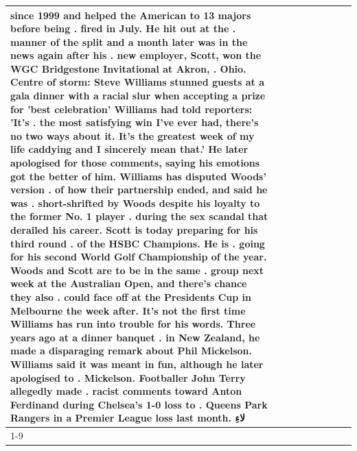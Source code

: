 \begin{table}[H]
\begin{tabular}{lllrlllll}
since 1999 and helped the American to 13 majors before being . fired in July. He hit out at the . manner of the split and a month later was in the news again after his . new employer, Scott, won the WGC Bridgestone Invitational at Akron, . Ohio. Centre of storm: Steve Williams stunned guests at a gala dinner with a racial slur when accepting a prize for 'best celebration' Williams had told reporters: 'It's . the most satisfying win I've ever had, there's no two ways about it. It's the greatest week of my life caddying and I sincerely mean that.' He later apologised for those comments, saying his emotions got the better of him. Williams has disputed Woods' version . of how their partnership ended, and said he was . short-shrifted by Woods despite his loyalty to the former No. 1 player . during the sex scandal that derailed his career. Scott is today preparing for his third round . of the HSBC Champions. He is . going for his second World Golf Championship of the year. Woods and Scott are to be in the same . group next week at the Australian Open, and there's chance they also . could face off at the Presidents Cup in Melbourne the week after. It's not the first time Williams has run into trouble for his words. Three years ago at a dinner banquet . in New Zealand, he made a disparaging remark about Phil Mickelson. Williams said it was meant in fun, although he later apologised to . Mickelson. Footballer John Terry allegedly made . racist comments toward Anton Ferdinand during Chelsea's 1-0 loss to . Queens Park Rangers in a Premier League loss last month. لاءِ \\
\cline{1-9}

\end{tabular}
\end{table}
